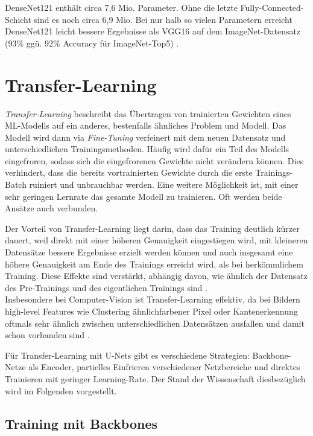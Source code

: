DenseNet121 enthält circa 7,6 Mio. Parameter. Ohne die letzte Fully-Connected-Schicht sind es noch circa 6,9 Mio. 
Bei nur halb so vielen Parametern erreicht DenseNet121 leicht bessere Ergebnisse als VGG16 auf dem ImageNet-Datensatz 
(93\% ggü. 92\% Accuracy für ImageNet-Top5) \cite{Huang.25082016}. 


\section{Transfer-Learning} \label{sec:transfer-learning}

\textit{Transfer-Learning} beschreibt das Übertragen von trainierten Gewichten eines \ac{ML}-Modells auf ein anderes, 
bestenfalls ähnliches Problem und Modell. Das Modell wird dann via \textit{Fine-Tuning} verfeinert mit dem neuen Datensatz und unterschiedlichen Trainingsmethoden.
Häufig wird dafür ein Teil des Modells eingefroren, sodass sich die eingefrorenen Gewichte nicht verändern können. Dies verhindert, 
dass die bereits vortrainierten Gewichte durch die erste Trainings-Batch ruiniert und unbrauchbar werden. Eine weitere Möglichkeit ist,
mit einer sehr geringen Lernrate das gesamte Modell zu trainieren. Oft werden beide Ansätze auch verbunden.

Der Vorteil von Transfer-Learning liegt darin, dass das Training deutlich kürzer dauert, 
weil direkt mit einer höheren Genauigkeit eingestiegen wird, mit kleineren Datensätze bessere Ergebnisse erzielt werden können
 und auch insgesamt eine höhere Genauigkeit 
am Ende des Trainings erreicht wird, als bei herkömmlichem Training. Diese Effekte sind verstärkt, 
abhängig davon, wie ähnlich der Datensatz des Pre-Trainings und des eigentlichen Trainings sind \cite{Ruder.3212017}. \\
Insbesondere bei Computer-Vision ist Transfer-Learning effektiv, da bei Bildern high-level Features wie Clustering 
ähnlichfarbener Pixel oder Kantenerkennung oftmals sehr ähnlich zwischen unterschiedlichen Datensätzen ausfallen 
und damit schon vorhanden sind \cite{Ruder.3212017}. 

Für Transfer-Learning mit U-Nets gibt es verschiedene Strategien: Backbone-Netze als Encoder, 
partielles Einfrieren verschiedener Netzbereiche und direktes Trainieren mit geringer Learning-Rate.
Der Stand der Wissenschaft diesbezüglich wird im Folgenden vorgestellt. 

\subsection{Training mit Backbones} \label{sec:transfer-learning:backbones}

